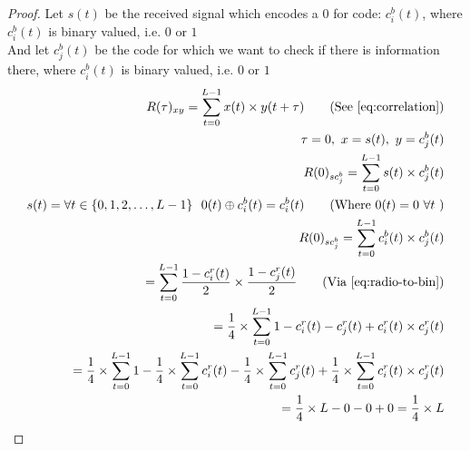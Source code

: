 		\begin{proof}
			Let $s(t)$ be the received signal which encodes a 0 for code: $c^b_i(t)$, where $c^b_i(t)$ is binary valued, i.e. $0$ or $1$ \\
			And let $c^b_j(t)$ be the code for which we want to check if there is information there, where $c^b_i(t)$ is binary valued, i.e. $0$ or $1$ \\

			\begin{align*}
				R(\tau)_{xy} = \displaystyle\sum_{t = 0} ^ {L - 1} x(t) \times y(t + \tau)	\tag{See \autoref{eq:correlation}}
				\\ \tau = 0,\ x = s(t),\ y = c^b_j(t)	
				\\ R(0)_{sc^b_{j}} = \displaystyle\sum_{t = 0} ^ {L - 1} s(t) \times c^b_j(t)	
				\\ s(t) = \forall t \in \{ 0, 1, 2, \dotsc, L - 1 \} \ \ 0(t) \oplus c^b_i(t) = c^b_i(t) \tag{Where $0(t) = 0 \ \forall t$ }
				\\ R(0)_{sc^b_{j}} = \displaystyle\sum_{t = 0} ^ {L - 1} c^b_i(t) \times c^b_j(t)
				\\ = \displaystyle\sum_{t = 0} ^ {L - 1} \frac{1 - c^r_i(t)}{2} \times \frac{1 - c^r_j(t)}{2} \tag{Via \autoref{eq:radio-to-bin}}
				\\ = \frac{1}{4} \times \displaystyle\sum_{t = 0} ^ {L - 1} 1 - c^r_i(t) - c^r_j(t) + c^r_i(t) \times c^r_j(t)
				\\ = \frac{1}{4} \times \displaystyle\sum_{t = 0} ^ {L - 1} 1 - \frac{1}{4} \times \displaystyle\sum_{t = 0} ^ {L - 1} c^r_i(t) - \frac{1}{4} \times \displaystyle\sum_{t = 0} ^ {L - 1} c^r_j(t) + \frac{1}{4} \times \displaystyle\sum_{t = 0} ^ {L - 1} c^r_i(t) \times c^r_j(t) 
				\\ = \frac{1}{4} \times L - 0 - 0 + 0 = \frac{1}{4} \times L
			\end{align*}

		\end{proof}

